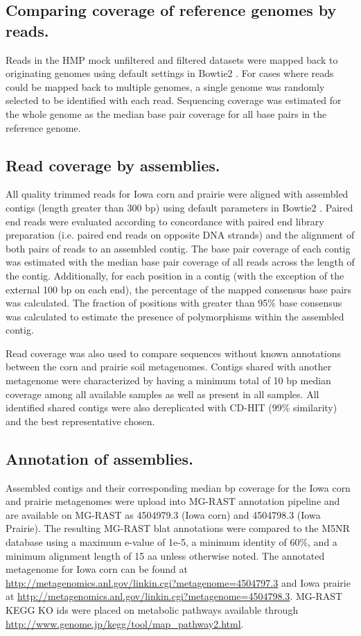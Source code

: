 \documentclass{pnastwo}
\begin{document}
\begin{article}
\subsection*{Comparing coverage of reference genomes by reads.}
Reads in the HMP mock unfiltered and filtered datasets were mapped
back to originating genomes using default settings in Bowtie2
\cite{bowtie}.  For cases where reads could be mapped back to multiple
genomes, a single genome was randomly selected to be identified with
each read.  Sequencing coverage was estimated for the whole genome as
the median base pair coverage for all base pairs in the reference
genome.

\subsection*{Read coverage by assemblies.}
All quality trimmed reads for Iowa corn and prairie were aligned with
assembled contigs (length greater than 300 bp) using default
parameters in Bowtie2 \cite{bowtie}.  Paired end reads were evaluated according to
concordance with paired end library preparation (i.e. paired end reads
on opposite DNA strands) and the alignment of both pairs of reads to
an assembled contig.  The base pair coverage of each contig was
estimated with the median base pair coverage of all reads across the
length of the contig.  Additionally, for each position in a contig
(with the exception of the external 100 bp on each end), the
percentage of the mapped consensus base pairs was calculated.  The
fraction of positions with greater than 95\% base consensus was
calculated to estimate the presence of polymorphisms within the
assembled contig.  

Read coverage was also used to compare sequences without known annotations between the corn and prairie soil metagenomes.  Contigs shared with another metagenome were characterized by 
having a minimum total of 10 bp median coverage among all available samples as well as present in all samples.  All identified shared contigs were also dereplicated with CD-HIT (99\% similarity) and the best representative chosen.

\subsection*{Annotation of assemblies.}
Assembled contigs and their corresponding median bp coverage for the
Iowa corn and prairie metagenomes were upload into MG-RAST annotation
pipeline \cite{Meyer:2008db} and are available on MG-RAST as 4504979.3 (Iowa corn)
and 4504798.3 (Iowa Prairie).  The resulting MG-RAST blat annotations
were compared to the M5NR database using a maximum e-value of 1e-5, a
minimum identity of 60\%, and a minimum alignment length of 15 aa unless otherwise noted.
The annotated metagenome for Iowa corn can be found at
\url{http://metagenomics.anl.gov/linkin.cgi?metagenome=4504797.3} and 
Iowa prairie at \url{http://metagenomics.anl.gov/linkin.cgi?metagenome=4504798.3}.
MG-RAST KEGG KO ids were placed on metabolic pathways available through  
 \url{http://www.genome.jp/kegg/tool/map_pathway2.html}.


\end{article}
\end{document}
